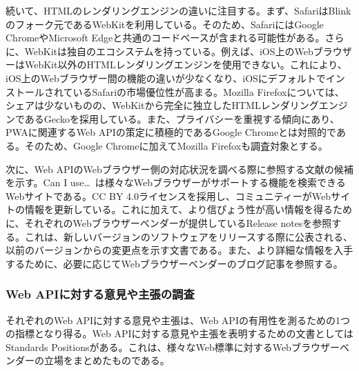 続いて、HTMLのレンダリングエンジンの違いに注目する。まず、SafariはBlinkのフォーク元であるWebKitを利用している。そのため、SafariにはGoogle ChromeやMicrosoft Edgeと共通のコードベースが含まれる可能性がある。さらに、WebKitは独自のエコシステムを持っている。例えば、iOS上のWebブラウザーはWebKit以外のHTMLレンダリングエンジンを使用できない。これにより、iOS上のWebブラウザー間の機能の違いが少なくなり、iOSにデフォルトでインストールされているSafariの市場優位性が高まる。Mozilla Firefoxについては、シェアは少ないものの、WebKitから完全に独立したHTMLレンダリングエンジンであるGeckoを採用している。また、プライバシーを重視する傾向にあり、PWAに関連するWeb APIの策定に積極的であるGoogle Chromeとは対照的である。そのため、Google Chromeに加えてMozilla Firefoxも調査対象とする。

次に、Web APIのWebブラウザー側の対応状況を調べる際に参照する文献の候補を示す。Can I use…~\cite{CanIUse}は様々なWebブラウザーがサポートする機能を検索できるWebサイトである。CC BY 4.0ライセンスを採用し、コミュニティーがWebサイトの情報を更新している。これに加えて、より信ぴょう性が高い情報を得るために、それぞれのWebブラウザーベンダーが提供しているRelease notesを参照する。これは、新しいバージョンのソフトウェアをリリースする際に公表される、以前のバージョンからの変更点を示す文書である。また、より詳細な情報を入手するために、必要に応じてWebブラウザーベンダーのブログ記事を参照する。
\subsubsection{Web APIに対する意見や主張の調査}\label{subsubsection:Web APIに対する意見や主張の調査}
それぞれのWeb APIに対する意見や主張は、Web APIの有用性を測るための1つの指標となり得る。Web APIに対する意見や主張を表明するための文書としてはStandards Positionsがある。これは、様々なWeb標準に対するWebブラウザーベンダーの立場をまとめたものである。
